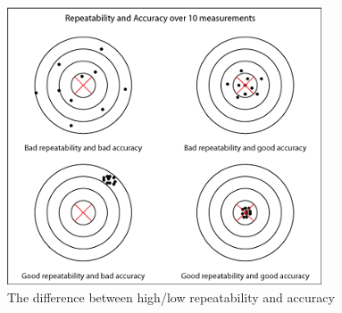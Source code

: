 \begin{figure}[H]
    \centering
    \includegraphics[width=.9\textwidth]{TechnicalAnlysis/RepeatTest.jpg}
    \caption{The difference between high/low repeatability and accuracy\cite{RepeatWhat}}
    \label{fig:Repeatability}
\end{figure}
